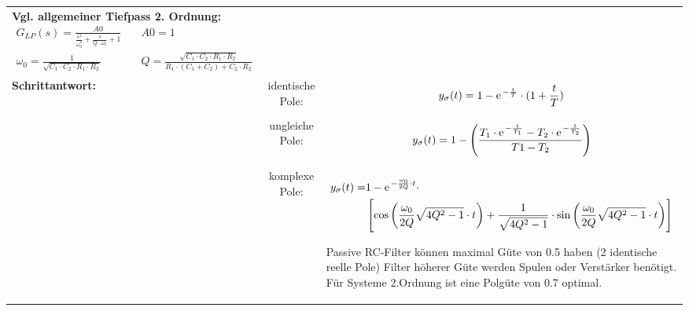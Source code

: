 \begin{longtable}{|>{\bfseries}p{3cm}|c|p{10cm}|}
{       \textbf{Vgl. allgemeiner Tiefpass 2. Ordnung:}\newline
       \begin{align*}
           G_{LP}(s)	= \frac{A0}{\frac{s^2}{\omega_{0}^2}+\frac{s}{Q\cdot\omega_{0}}+1} &
           \quad A0 = 1 \\
           \omega_{0}	= \frac{1}{\sqrt{C_1\cdot C_2\cdot R_1\cdot R_2}}&\quad Q=\frac{\sqrt{C_1\cdot C_2\cdot R_1\cdot R_2}}{R_1\cdot (C_1+C_2)+C_2 \cdot R_2}
        \end{align*}
        } \\
        \textbf{Schrittantwort:}&{
        
        identische Pole: }&{
        \[y_{\sigma}(t) = 1-\e^{-\frac{t}{T}}\cdot(1+\frac{t}{T})\] }\\
          &{
        ungleiche Pole: }&{
        \[y_{\sigma}(t) = 1-\left(\frac{T_1 \cdot \e^{-\frac{t}{T_1}}- T_2 \cdot
        \e^{-\frac{t}{T_2}}}{T1-T_2}\right) \]}\\
        &{komplexe Pole:}&{
        \begin{align*}
          y_{\sigma}(t) = &1-\e^{-\frac{\omega_0}{2Q}\cdot t}\cdot \\
          &\left[\cos \left(\frac{\omega_0}{2Q} \sqrt{4Q^2-1} \cdot t \right) +
          \frac{1}{\sqrt{4Q^2-1}}\cdot \sin\left(\frac{\omega_0}{2Q} \sqrt{4Q^2-1} \cdot t \right)\right]
        \end{align*} \newline
        
        Passive RC-Filter können maximal Güte von 0.5 haben (2 identische reelle Pole) Filter höherer 
        Güte werden Spulen oder Verstärker benötigt. Für Systeme 2.Ordnung ist eine Polgüte von 0.7 optimal.
      }
      \\ \hline
      
      \end{longtable}
      
